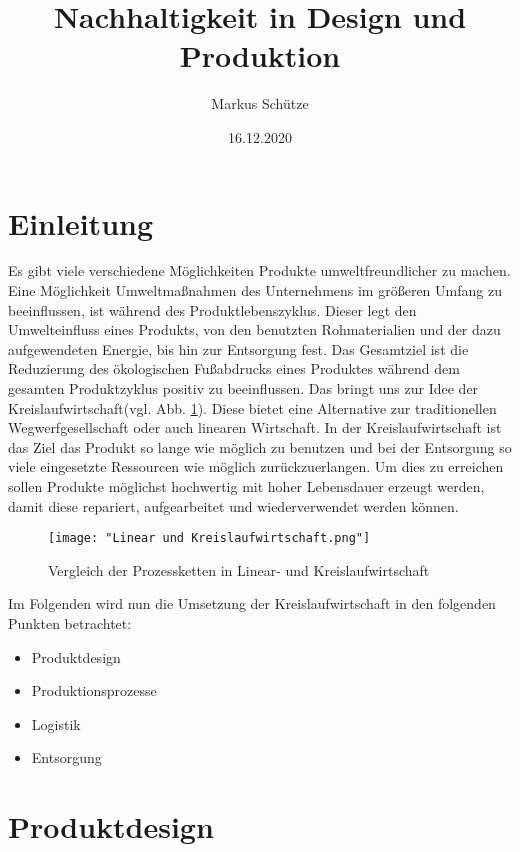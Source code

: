 \documentclass[13pt,titlepage]{article}
\title{Nachhaltigkeit in Design und Produktion}
\date{16.12.2020}
\author{Markus Schütze}
\begin{document}
\maketitle
\tableofcontents
\newpage

\section {Einleitung}
	Es gibt viele verschiedene M\"oglichkeiten Produkte umweltfreundlicher zu machen.
Eine Möglichkeit Umweltmaßnahmen des Unternehmens im größeren Umfang zu beeinflussen, ist während des Produktlebenszyklus. 
Dieser legt den Umwelteinfluss eines Produkts, von den benutzten Rohmaterialien und der dazu aufgewendeten Energie, bis hin zur Entsorgung fest. 
Das Gesamtziel ist die Reduzierung des ökologischen Fußabdrucks eines Produktes während dem gesamten Produktzyklus positiv zu beeinflussen. 
Das bringt uns zur Idee der Kreislaufwirtschaft(vgl. Abb. \ref{fig:LinearKreislaufwirtschaft}). 
Diese bietet eine Alternative zur traditionellen Wegwerfgesellschaft oder auch linearen Wirtschaft.
In der Kreislaufwirtschaft ist das Ziel das Produkt so lange wie m\"oglich zu benutzen und bei der Entsorgung so viele eingesetzte Ressourcen wie m\"oglich zur\"uckzuerlangen. 
Um dies zu erreichen sollen Produkte m\"oglichst hochwertig mit hoher Lebensdauer erzeugt werden, damit diese repariert, aufgearbeitet und wiederverwendet werden können\protect\footnotemark{}.

\begin{figure}[h]
 \centering
 \texttt{[image: "Linear und Kreislaufwirtschaft.png"]}
 \caption{Vergleich der Prozessketten in Linear- und Kreislaufwirtschaft\protect\footnotemark}
 \label{fig:LinearKreislaufwirtschaft}
\end{figure}

Im Folgenden wird nun die Umsetzung der Kreislaufwirtschaft in den folgenden Punkten betrachtet:

\begin{itemize}
  \item Produktdesign
  \item Produktionsprozesse
  \item Logistik
  \item Entsorgung
\end{itemize}
\newpage
\section{Produktdesign}
\end{document}
